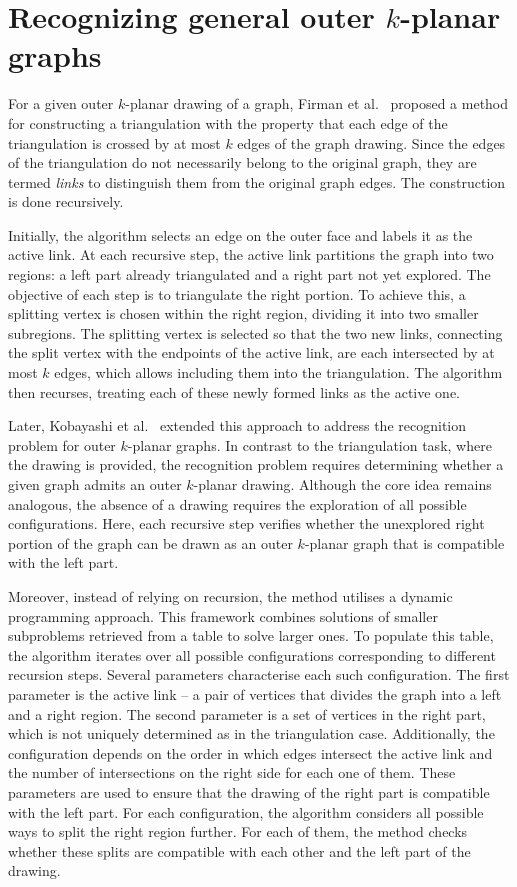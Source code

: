 \section{Recognizing general outer \(k\)-planar graphs}

For a given outer \(k\)-planar drawing of a graph, Firman et al.~\cite{triangulations} proposed a method for constructing a triangulation with the property that each edge of the triangulation is crossed by at most \(k\) edges of the graph drawing. Since the edges of the triangulation do not necessarily belong to the original graph, they are termed \emph{links} to distinguish them from the original graph edges. The construction is done recursively.

Initially, the algorithm selects an edge on the outer face and labels it as the active link. At each recursive step, the active link partitions the graph into two regions: a left part already triangulated and a right part not yet explored. The objective of each step is to triangulate the right portion. To achieve this, a splitting vertex is chosen within the right region, dividing it into two smaller subregions. The splitting vertex is selected so that the two new links, connecting the split vertex with the endpoints of the active link, are each intersected by at most \(k\) edges, which allows including them into the triangulation. The algorithm then recurses, treating each of these newly formed links as the active one.

Later, Kobayashi et al.~\cite{okp} extended this approach to address the recognition problem for outer \(k\)-planar graphs. In contrast to the triangulation task, where the drawing is provided, the recognition problem requires determining whether a given graph admits an outer \(k\)-planar drawing. Although the core idea remains analogous, the absence of a drawing requires the exploration of all possible configurations. Here, each recursive step verifies whether the unexplored right portion of the graph can be drawn as an outer \(k\)-planar graph that is compatible with the left part.

Moreover, instead of relying on recursion, the method utilises a dynamic programming approach. This framework combines solutions of smaller subproblems retrieved from a table to solve larger ones. To populate this table, the algorithm iterates over all possible configurations corresponding to different recursion steps. Several parameters characterise each such configuration. The first parameter is the active link -- a pair of vertices that divides the graph into a left and a right region. The second parameter is a set of vertices in the right part, which is not uniquely determined as in the triangulation case. Additionally, the configuration depends on the order in which edges intersect the active link and the number of intersections on the right side for each one of them. These parameters are used to ensure that the drawing of the right part is compatible with the left part. For each configuration, the algorithm considers all possible ways to split the right region further. For each of them, the method checks whether these splits are compatible with each other and the left part of the drawing.

